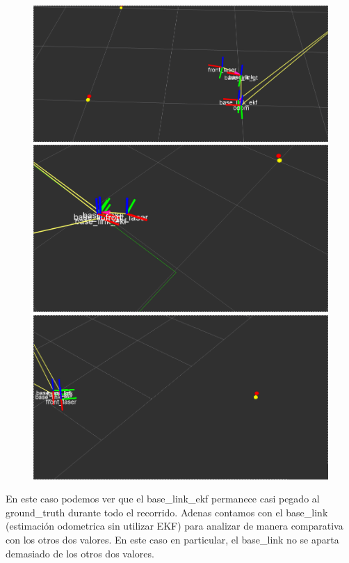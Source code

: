 \begin{figure}[!htb]
  \includegraphics[width=\linewidth]{imagenesEKF/k0.4/1.png}
\endminipage\hfill
{}
  \includegraphics[width=\linewidth]{imagenesEKF/k0.4/2.png}
\endminipage\hfill
{}%
  \includegraphics[width=\linewidth]{imagenesEKF/k0.4/3.png}
\endminipage
\end{figure}

En este caso podemos ver que el base\_link\_ekf permanece casi pegado al ground\_truth durante todo el recorrido. Adenas contamos con el base\_link (estimación odometrica sin utilizar EKF) para analizar de manera comparativa con los otros dos valores. En este caso en particular, el base\_link no se aparta demasiado de los otros dos valores.

